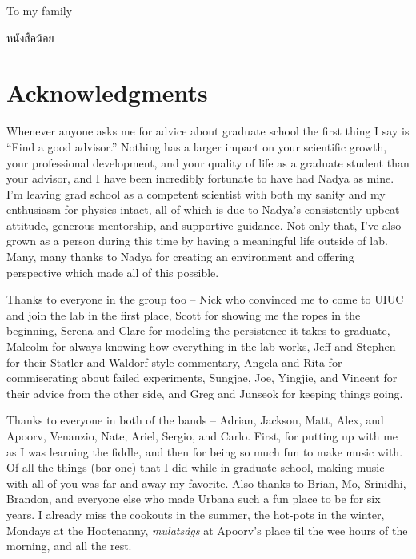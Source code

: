 \documentclass[edeposit,fullpage,draftthesis]{uiucthesis2009}
\begin{document}
\begin{dedication}
To my family

\foreignlanguage{thai}{\textthai{หนังสือน้อย}}

\end{dedication}

\chapter*{Acknowledgments}

Whenever anyone asks me for advice about graduate school the first thing
I say is ``Find a good advisor.'' Nothing has a larger impact on your scientific growth, 
your professional development, and your quality
of life as a graduate student than your advisor, and I have been incredibly fortunate
to have had Nadya as mine. I'm leaving grad school as a competent scientist with both my sanity and my enthusiasm
for physics intact, all of which is due to Nadya's consistently upbeat attitude, generous mentorship,
and supportive guidance. 
Not only that, I've also grown as a person
during this time by having a meaningful life outside of lab.
Many, many thanks to Nadya for creating an environment and offering perspective 
which made all of this possible.


Thanks to everyone in the group too -- Nick who convinced me to come to UIUC and join
the lab in the first place, Scott for showing me the ropes in the beginning, Serena and Clare 
for modeling the persistence it takes to graduate, Malcolm for always knowing how
everything in the lab works, Jeff and Stephen for their Statler-and-Waldorf style commentary, 
Angela and Rita for commiserating about failed experiments, Sungjae, Joe, Yingjie,
and Vincent for their advice from the other side, and Greg and Junseok for keeping things going.

Thanks to everyone in both of the bands -- Adrian, Jackson, Matt, Alex, and Apoorv,
Venanzio, Nate, Ariel, Sergio, and Carlo. First, for putting up with me as I
was learning the fiddle, and then for being so much fun to make music with.
Of all the things (bar one) that I did while in graduate school, making music
with all of you was far and away my favorite. Also thanks to Brian, Mo, Srinidhi, Brandon,
and everyone else who made Urbana such a fun place to be for six years. I already miss the
cookouts in the summer, the hot-pots in the winter,
Mondays at the Hootenanny, \textit{mulats\'{a}gs} at Apoorv's place til the wee hours of the morning,
and all the rest.
\end{document}
